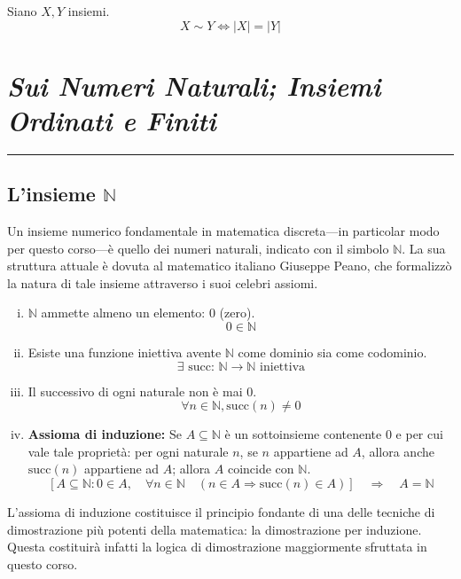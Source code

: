 \documentclass[oneside]{book}
\theoremstyle{remark}
\newcommand{\chptr}[1]{\chapter{\textit{#1}}\noindent\rule{\textwidth}{1pt}}
\begin{document}
\begin{tcolorbox}[title={Equipotenza e cardinali}]
Siano $X,Y$ insiemi.
\[ X\sim Y \Longleftrightarrow |X|=|Y| \]
\end{tcolorbox}




\chptr{Sui Numeri Naturali; Insiemi Ordinati e Finiti}
\section{L'insieme $\mathbb{N}$}
Un insieme numerico fondamentale in matematica discreta—in
particolar modo per questo corso—è quello dei numeri naturali,
indicato con il simbolo $\mathbb{N}$. La sua struttura attuale
è dovuta al matematico italiano Giuseppe Peano, che formalizzò
la natura di tale insieme attraverso i suoi celebri assiomi.
\begin{tcolorbox}[colback=yellow!30, colframe=yellow!30!black, title=Assiomi di Peano]
\begin{enumerate}[(i)]
    \item $\mathbb{N}$ ammette almeno un elemento: 0 (zero). \[ 0 \in \mathbb{N} \]
    \item Esiste una funzione iniettiva avente $\mathbb{N}$ come dominio sia come codominio.
    \[ \exists \text{ succ: } \mathbb{N} \rightarrow \mathbb{N} \text{ iniettiva} \]
    \item Il successivo di ogni naturale non è mai 0.
    \[ \forall n \in \mathbb{N}, \text{succ}(n) \not = 0 \]
    \item \textbf{Assioma di induzione:} Se $A\subseteq\mathbb{N}$ è un sottoinsieme contenente 0 e
    per cui vale tale proprietà: per ogni naturale $n$, se $n$ appartiene
    ad $A$, allora anche $\text{succ}(n)$ appartiene ad $A$; allora $A$
    coincide con $\mathbb{N}$.
    \[ [A \subseteq \mathbb{N}: 0 \in A, \quad \forall n \in \mathbb{N} \quad (n \in A \Rightarrow \text{succ}(n) \in A)] \quad \Longrightarrow \quad A = \mathbb{N} \]
\end{enumerate}
\end{tcolorbox}

L'assioma di induzione costituisce il principio fondante di
una delle tecniche di dimostrazione più potenti della matematica:
la dimostrazione per induzione. Questa costituirà infatti la
logica di dimostrazione maggiormente sfruttata in questo corso.
\end{document}
